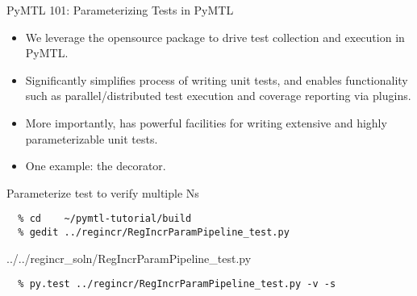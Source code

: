 \begin{frame}{PyMTL 101: Parameterizing Tests in PyMTL}
\begin{itemize}
  \item We leverage the opensource  package to drive test
        collection and execution in PyMTL.
  \item Significantly simplifies process of writing unit tests, and
        enables functionality such as parallel/distributed test execution
        and coverage reporting via plugins.
  \item More importantly,  has powerful facilities for writing
        extensive and highly parameterizable unit tests.
  \item One example: the  decorator.
\end{itemize}
\end{frame}

\begin{task}\begin{frame}[fragile]{Parameterize test to verify multiple Ns}
\vspace{-0.25in}
\begin{verbatim}
  % cd    ~/pymtl-tutorial/build
  % gedit ../regincr/RegIncrParamPipeline_test.py
\end{verbatim}

\vspace{-0.3in}
%
{../../regincr_soln/RegIncrParamPipeline_test.py}

\vspace{-0.3in}
\begin{verbatim}
  % py.test ../regincr/RegIncrParamPipeline_test.py -v -s
\end{verbatim}
\end{frame}
\end{task}

